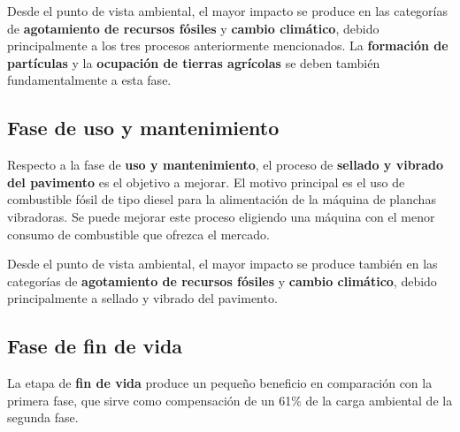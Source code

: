 Desde el punto de vista ambiental, el mayor impacto se produce en las categorías de \textbf{agotamiento de recursos fósiles} y \textbf{cambio climático}, debido principalmente a los tres procesos anteriormente mencionados. La \textbf{formación de partículas} y la \textbf{ocupación de tierras agrícolas} se deben también fundamentalmente a esta fase.

\subsection{Fase de uso y mantenimiento}
Respecto a la fase de \textbf{uso y mantenimiento}, el proceso de \textbf{sellado y vibrado del pavimento} es el objetivo a mejorar. El motivo principal es el uso de combustible fósil de tipo diesel para la alimentación de la máquina de planchas vibradoras. Se puede mejorar este proceso eligiendo una máquina con el menor consumo de combustible que ofrezca el mercado.

Desde el punto de vista ambiental, el mayor impacto se produce también en las categorías de \textbf{agotamiento de recursos fósiles} y \textbf{cambio climático}, debido principalmente a sellado y vibrado del pavimento.

\subsection{Fase de fin de vida}
La etapa de \textbf{fin de vida} produce un pequeño beneficio en comparación con la primera fase, que sirve como compensación de un 61\% de la carga ambiental de la segunda fase.
